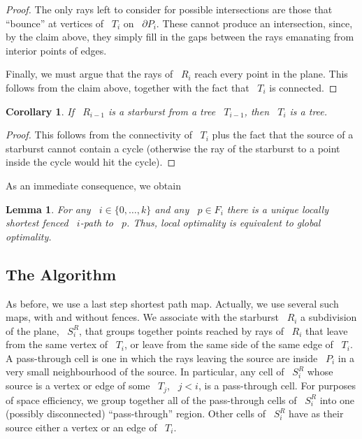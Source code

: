 \documentclass[11pt]{article}
\newtheorem{lemma}{Lemma}
\newtheorem{corollary}{Corollary}
\begin{document}
\begin{proof}
The only rays left to consider for possible intersections are those that ``bounce'' at vertices of ~\(T_i\) on ~\(\partial P_i\).
These cannot produce an intersection, since, by the claim above, they simply fill in the gaps between the rays emanating from interior points of edges.

Finally, we must argue that the rays of ~\(R_i\) reach every point in the plane.
This follows from the claim above, together with the fact that ~\(T_i\) is connected.
\end{proof}

\begin{corollary}
If ~\(R_{i-1}\) is a starburst from a tree ~\(T_{i-1}\), then ~\(T_i\) is a tree.
\end{corollary}

\begin{proof}
This follows from the connectivity of ~\(T_i\) plus the fact that the source of a starburst cannot contain a cycle (otherwise the ray of the starburst to a point inside the cycle would hit the cycle).
\end{proof}

As an immediate consequence, we obtain

\begin{lemma}
\label{lem:main-general}
For any ~\(i \in \{0, \ldots, k\}\) and any ~\(p \in F_i\) there is a unique locally shortest fenced ~\(i\)-path to ~\(p\). Thus, local optimality is equivalent to global optimality.
\end{lemma}

\subsection{The Algorithm}

As before, we use a last step shortest path map.
Actually, we use several such maps, with and without fences.
We associate with the starburst ~\(R_i\) a subdivision of the plane, ~\(S_i^R\), that groups together points reached by rays of ~\(R_i\) that leave from the same vertex of ~\(T_i\), or leave from the same side of the same edge of ~\(T_i\).
A pass-through cell is one in which the rays leaving the source are inside ~\(P_i\) in a very small neighbourhood of the source.
In particular, any cell of ~\(S_i^R\) whose source is a vertex or edge of some ~\(T_j\), ~\(j < i\), is a pass-through cell.
For purposes of space efficiency, we group together all of the pass-through cells of ~\(S_i^R\) into one (possibly disconnected) ``pass-through'' region.
Other cells of ~\(S_i^R\) have as their source either a vertex or an edge of ~\(T_i\).
\end{document}
